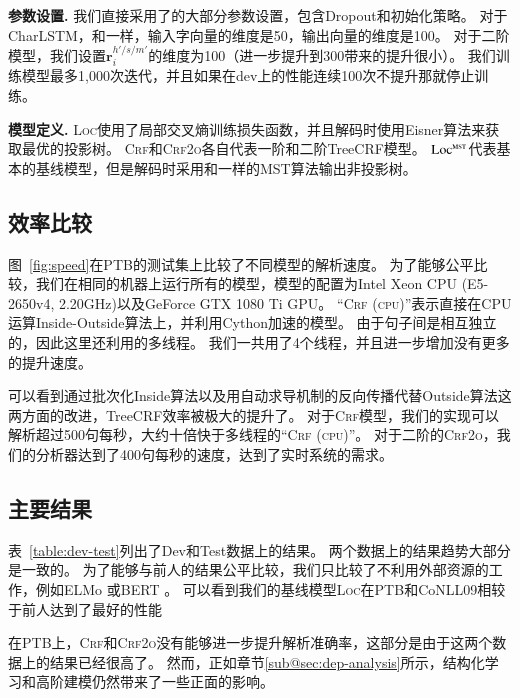 

\noindent\textbf{参数设置.}
我们直接采用了\citet{dozat-etal-2017-biaffine}的大部分参数设置，包含Dropout和初始化策略。
对于CharLSTM，和\citet{lample-etal-2016-neural}一样，输入字向量的维度是50，输出向量的维度是100。
对于二阶模型，我们设置$\mathbf{r}^{h'/s/m'}_i$的维度为100（进一步提升到300带来的提升很小）。
我们训练模型最多1,000次迭代，并且如果在dev上的性能连续100次不提升那就停止训练。

\noindent\textbf{模型定义.}
\textsc{Loc}使用了局部交叉熵训练损失函数，并且解码时使用Eisner算法来获取最优的投影树。
\textsc{Crf}和\textsc{Crf2o}各自代表一阶和二阶TreeCRF模型。
$\textsc{Loc}^{\textsc{mst}}$代表基本的基线模型，但是解码时采用和\citet{dozat-etal-2017-biaffine}一样的MST算法输出非投影树。

\subsection{效率比较}

图~\ref{fig:speed}在PTB的测试集上比较了不同模型的解析速度。
为了能够公平比较，我们在相同的机器上运行所有的模型，模型的配置为Intel Xeon CPU (E5-2650v4, 2.20GHz)以及GeForce GTX 1080 Ti GPU。
``\textsc{Crf (cpu)}''表示直接在CPU运算Inside-Outside算法上，并利用Cython加速的模型。
由于句子间是相互独立的，因此这里还利用的多线程。
我们一共用了4个线程，并且进一步增加没有更多的提升速度。

可以看到通过批次化Inside算法以及用自动求导机制的反向传播代替Outside算法这两方面的改进，TreeCRF效率被极大的提升了。
对于\textsc{Crf}模型，我们的实现可以解析超过500句每秒，大约十倍快于多线程的``\textsc{Crf (cpu)}''。
对于二阶的\textsc{Crf2o}，我们的分析器达到了400句每秒的速度，达到了实时系统的需求。

\subsection{主要结果}

表~\ref{table:dev-test}列出了Dev和Test数据上的结果。
两个数据上的结果趋势大部分是一致的。
为了能够与前人的结果公平比较，我们只比较了不利用外部资源的工作，例如ELMo \citep{peters-etal-2018-deep}或BERT \citep{devlin-etal-2019-bert}。
可以看到我们的基线模型\textsc{Loc}在PTB和CoNLL09相较于前人达到了最好的性能

在PTB上，\textsc{Crf}和\textsc{Crf2o}没有能够进一步提升解析准确率，这部分是由于这两个数据上的结果已经很高了。
然而，正如章节\ref{sub@sec:dep-analysis}所示，结构化学习和高阶建模仍然带来了一些正面的影响。

